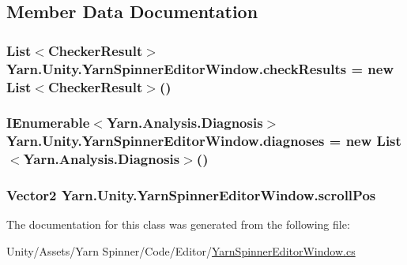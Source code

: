 \subsection{Member Data Documentation}
\hypertarget{a00099_aa85ab7bd194e5425b991b9c216d4d10e}{
\subsubsection[{check\-Results}]{\setlength{\rightskip}{0pt plus 5cm}List$<${\bf Checker\-Result}$>$ Yarn.\-Unity.\-Yarn\-Spinner\-Editor\-Window.\-check\-Results = new List$<${\bf Checker\-Result}$>$()\hspace{0.3cm}{\ttfamily [private]}}}\label{a00099_aa85ab7bd194e5425b991b9c216d4d10e}
\hypertarget{a00099_ab4784aaee761b7c60bb142cd410eb774}{
\subsubsection[{diagnoses}]{\setlength{\rightskip}{0pt plus 5cm}I\-Enumerable$<${\bf Yarn.\-Analysis.\-Diagnosis}$>$ Yarn.\-Unity.\-Yarn\-Spinner\-Editor\-Window.\-diagnoses = new List$<${\bf Yarn.\-Analysis.\-Diagnosis}$>$()\hspace{0.3cm}{\ttfamily [private]}}}\label{a00099_ab4784aaee761b7c60bb142cd410eb774}
\hypertarget{a00099_a2d9b9702b0980af9d4202aebd440124b}{
\subsubsection[{scroll\-Pos}]{\setlength{\rightskip}{0pt plus 5cm}Vector2 Yarn.\-Unity.\-Yarn\-Spinner\-Editor\-Window.\-scroll\-Pos\hspace{0.3cm}{\ttfamily [private]}}}\label{a00099_a2d9b9702b0980af9d4202aebd440124b}


The documentation for this class was generated from the following file\-:\begin{DoxyCompactItemize}
\item 
Unity/\-Assets/\-Yarn Spinner/\-Code/\-Editor/\hyperlink{a00127}{Yarn\-Spinner\-Editor\-Window.\-cs}\end{DoxyCompactItemize}
